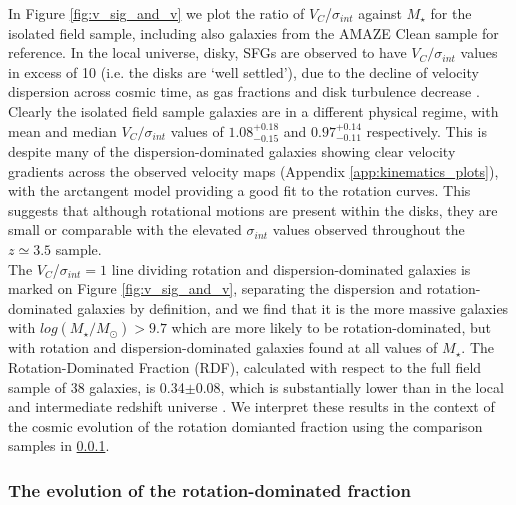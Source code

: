 \documentclass[fleqn,usenatbib]{mn2e}
\begin{document}
In Figure \ref{fig:v_sig_and_v} we plot the ratio of $V_{C}$/$\sigma_{int}$ against $M_{\star}$ for the isolated field sample, including also galaxies from the AMAZE Clean sample for reference.
In the local universe, disky, SFGs are observed to have $V_{C}/\sigma_{int}$ values in excess of 10 (i.e. the disks are `well settled'), due to the decline of velocity dispersion across cosmic time, as gas fractions and disk turbulence decrease \citep[e.g.][]{Epinat2008,Epinat2008a}.
Clearly the isolated field sample galaxies are in a different physical regime, with mean and median $V_{C}/\sigma_{int}$ values of $1.08^{+0.18}_{-0.15}$ and $0.97^{+0.14}_{-0.11}$ respectively.
This is despite many of the dispersion-dominated galaxies showing clear velocity gradients across the observed velocity maps (Appendix \ref{app:kinematics_plots}), with the arctangent model providing a good fit to the rotation curves.
This suggests that although rotational motions are present within the disks, they are small or comparable with the elevated $\sigma_{int}$ values observed throughout the $z\simeq3.5$ sample. \\

The $V_{C}$/$\sigma_{int}=1$ line dividing rotation and dispersion-dominated galaxies is marked on Figure \ref{fig:v_sig_and_v}, separating the dispersion and rotation-dominated galaxies by definition, and we find that it is the more massive galaxies with $log(M_{\star}/M_{\odot}) > 9.7$ which are more likely to be rotation-dominated, but with rotation and dispersion-dominated galaxies found at all values of $M_{\star}$.
The Rotation-Dominated Fraction (RDF), calculated with respect to the full field sample of 38 galaxies, is 0.34$\pm0.08$, which is substantially lower than in the local and intermediate redshift universe \citep[e.g.][]{Epinat2008a,Epinat2008,Green2014}.
We interpret these results in the context of the cosmic evolution of the rotation domianted fraction using the comparison samples in \cref{subsubsec:RDF_evolution}.\\

\subsubsection{The evolution of the rotation-dominated fraction}\label{subsubsec:RDF_evolution}
\end{document}
